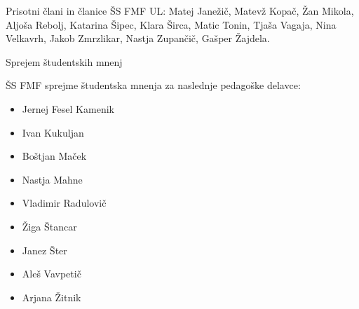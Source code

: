 \documentclass{seja}
\begin{document}
Prisotni člani in članice ŠS FMF UL:
Matej Janežič, Matevž Kopač, Žan Mikola, Aljoša Rebolj, Katarina Šipec, Klara Širca, Matic Tonin, Tjaša Vagaja, Nina Velkavrh, Jakob Zmrzlikar, Nastja Zupančič, Gašper Žajdela.

\begin{red}
    \item
    Sprejem študentskih mnenj
\end{red}

\begin{ad}
    \item  
    \begin{sklep*}
       ŠS FMF sprejme študentska mnenja za naslednje pedagoške delavce:
       \begin{itemize}
            \item Jernej Fesel Kamenik
            \item Ivan Kukuljan
            \item Boštjan Maček
            \item Nastja Mahne
            \item Vladimir Radulovič
            \item Žiga Štancar
            \item Janez Šter
            \item Aleš Vavpetič
            \item Arjana Žitnik
       \end{itemize}
    \end{sklep*}
   
\end{ad}
\makeatletter \global\let\@enddocumenthook\@empty \makeatother
{}
\end{document}
